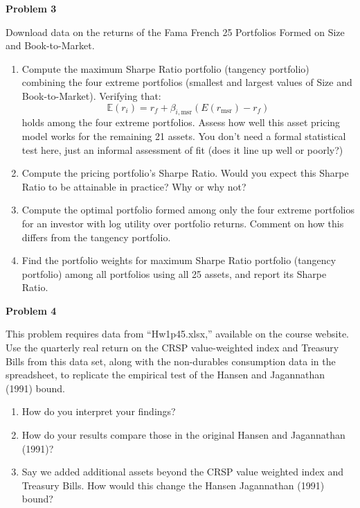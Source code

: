 \documentclass[12pt]{article}
\newcommand{\E}{\mathbb{E}}
\begin{document}
\vskip 12pt

\noindent \textbf{Problem 3}

Download data on the returns of the Fama French 25 Portfolios Formed on Size and Book-to-Market. 

\begin{enumerate}[label=(\Alph*)]
\item Compute the maximum Sharpe Ratio portfolio (tangency portfolio) combining the four extreme portfolios (smallest and largest values of Size and Book-to-Market). Verifying that:
$$\E( r_i ) = r_f + \beta_{i,\text{msr}} \left( E( r_\text{msr}) - r_f \right)$$
holds among the four extreme portfolios. Assess how well this asset pricing model works for the remaining 21 assets. You don't need a formal statistical test here, just an informal assessment of fit (does it line up well or poorly?)
\item Compute the pricing portfolio's Sharpe Ratio. Would you expect this Sharpe Ratio to be attainable in practice? Why or why not?
\item Compute the optimal portfolio formed among only the four extreme portfolios for an investor with log utility over portfolio returns. Comment on how this differs from the tangency portfolio.
\item Find the portfolio weights for maximum Sharpe Ratio portfolio (tangency portfolio) among all portfolios using all 25 assets, and report its Sharpe Ratio.
\end{enumerate}

\noindent \textbf{Problem 4}

This problem requires data from ``Hw1p45.xlsx,'' available on the course website. Use the quarterly real return on the CRSP value-weighted index and Treasury Bills from this data set, along with the non-durables consumption data in the spreadsheet, to replicate the empirical test of the Hansen and Jagannathan (1991) bound. 
\begin{enumerate}[label=(\Alph*)]
\item How do you interpret your findings?
\item How do your results compare those in the original Hansen and Jagannathan (1991)?
\item Say we added additional assets beyond the CRSP value weighted index and Treasury Bills. How would this change the Hansen Jagannathan (1991) bound?
\end{enumerate}

\vskip 12pt
\end{document}
